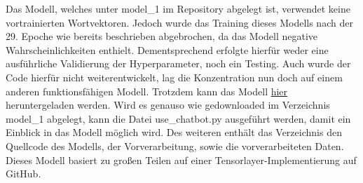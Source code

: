 \documentclass{aa}
\begin{document}
    Das Modell, welches unter model\_1 im Repository abgelegt ist, verwendet keine vortrainierten Wortvektoren. Jedoch wurde das Training dieses Modells nach der 29. Epoche wie bereits beschrieben abgebrochen, da das Modell negative Wahrscheinlichkeiten enthielt. Dementsprechend erfolgte hierfür weder eine ausführliche Validierung der Hyperparameter, noch ein Testing. Auch wurde der Code hierfür nicht weiterentwickelt, lag die Konzentration nun doch auf einem anderen funktionsfähigen Modell. Trotzdem kann das Modell \href{https://drive.google.com/file/d/1-Wye2qLMIkrWpGFL0dcdSIaJVQuqD5T2/view?usp=sharing}{hier} heruntergeladen werden. Wird es genauso wie gedownloaded im Verzeichnis model\_1 abgelegt, kann die Datei use\_chatbot.py ausgeführt werden, damit ein Einblick in das Modell möglich wird. Des weiteren enthält das Verzeichnis den Quellcode des Modells, der Vorverarbeitung, sowie die vorverarbeiteten Daten. Dieses Modell basiert zu großen Teilen auf einer Tensorlayer-Implementierung auf GitHub. \cite[Vgl.]{tensorlayer} \\
\end{document}
